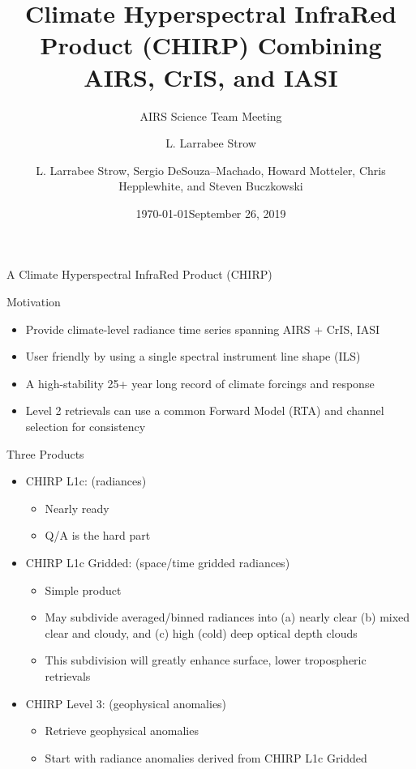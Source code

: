 \documentclass[10pt,t]{beamer}
\author{L. Larrabee Strow}
\date{\today}
\title{\large Climate Hyperspectral InfraRed Product (CHIRP) Combining AIRS, CrIS, and IASI}
\subtitle{\footnotesize{AIRS Science Team Meeting}}
\date{\vspace{0.1in}\footnotesize{September 26, 2019 \vfill}}
\author{L. Larrabee Strow\inst{1,2}, Sergio DeSouza--Machado\inst{1,2}, Howard Motteler\inst{2}, Chris Hepplewhite\inst{2}, and Steven Buczkowski\inst{2}}
\institute[UMBC]{\inst{1} UMBC Physics Dept. \and \inst{2}UMBC JCET}
\begin{document}
\maketitle
{}

\begin{frame}[label={sec:org29558bb},shrink=20]{A Climate Hyperspectral InfraRed Product (CHIRP)}
\vspace{-0.1in}
\begin{block}{Motivation}
\begin{itemize}
\item Provide climate-level radiance time series spanning AIRS + CrIS, IASI
\item User friendly by using a single spectral instrument line shape (ILS)
\item A high-stability 25+ year long record of climate forcings and response
\item Level 2 retrievals can use a common Forward Model (RTA) and channel selection for consistency
\end{itemize}
\end{block}

\begin{block}{Three Products}
\begin{itemize}
\item CHIRP L1c: (radiances)
\begin{itemize}
\item Nearly ready
\item Q/A is the hard part
\end{itemize}
\item CHIRP L1c Gridded: (space/time gridded radiances)
\begin{itemize}
\item Simple product
\item May subdivide averaged/binned radiances into (a) nearly clear (b) mixed clear and cloudy, and (c) high (cold) deep optical depth clouds
\item This subdivision will greatly enhance surface, lower tropospheric retrievals
\end{itemize}
\item CHIRP Level 3: (geophysical anomalies)
\begin{itemize}
\item Retrieve geophysical anomalies
\item Start with radiance anomalies derived from CHIRP L1c Gridded
\end{itemize}
\end{itemize}
\end{block}
\end{frame}
\end{document}
